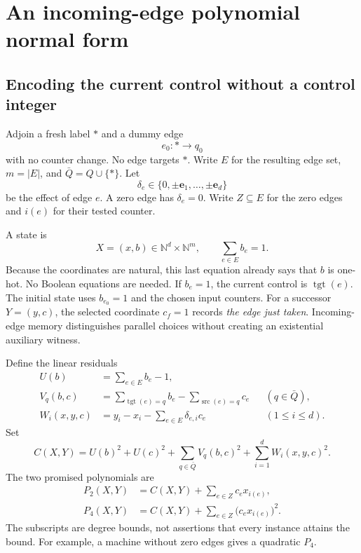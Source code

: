 \documentclass[11pt,letterpaper]{article}
\theoremstyle{definition}
\theoremstyle{remark}
\newcommand{\N}{\mathbb N}
\newcommand{\src}{\operatorname{src}}
\newcommand{\tgt}{\operatorname{tgt}}
\newcommand{\1}{\mathbf 1}
\newcommand{\srctag}[1]{\texorpdfstring{\hspace{0.4em}{\normalfont\small\color{accent}[source #1]}}{ [source #1]}}
\begin{document}
\section{An incoming-edge polynomial normal form\srctag{11}}\label{lbh:ql:sec:compiler}

\subsection{Encoding the current control without a control integer}
Adjoin a fresh label $*$ and a dummy edge
\[
 e_0:*\longrightarrow q_0
\]
with no counter change. No edge targets $*$. Write $E$ for the resulting edge
set, $m=|E|$, and $\bar Q=Q\cup\{*\}$. Let
\[
 \delta_e\in\{0,\pm\mathbf e_1,\ldots,\pm\mathbf e_d\}
\]
be the effect of edge $e$. A zero edge has $\delta_e=0$. Write $Z\subseteq E$
for the zero edges and $i(e)$ for their tested counter.

A state is
\[
 X=(x,b)\in\N^d\times\N^m,
 \qquad\sum_{e\in E}b_e=1.
\]
Because the coordinates are natural, this last equation already says that
$b$ is one-hot. No Boolean equations are needed. If $b_e=1$, the current
control is $\tgt(e)$. The initial state uses $b_{e_0}=1$ and the chosen input
counters. For a successor $Y=(y,c)$, the selected coordinate $c_f=1$ records
\emph{the edge just taken}. Incoming-edge memory distinguishes parallel
choices without creating an existential auxiliary witness.

Define the linear residuals
\begin{align}
 U(b)&=\sum_{e\in E}b_e-1,\label{lbh:ql:eq:U}\\
 V_q(b,c)&=\sum_{\tgt(e)=q}b_e-\sum_{\src(e)=q}c_e
              &&(q\in\bar Q),\label{lbh:ql:eq:V}\\
 W_i(x,y,c)&=y_i-x_i-\sum_{e\in E}\delta_{e,i}c_e
              &&(1\leq i\leq d).\label{lbh:ql:eq:W}
\end{align}
Set
\begin{equation}\label{lbh:ql:eq:common}
 C(X,Y)=U(b)^2+U(c)^2+
       \sum_{q\in\bar Q}V_q(b,c)^2+
       \sum_{i=1}^dW_i(x,y,c)^2.
\end{equation}
The two promised polynomials are
\begin{align}
 P_2(X,Y)&=C(X,Y)+\sum_{e\in Z}c_e x_{i(e)},\label{lbh:ql:eq:P2}\\
 P_4(X,Y)&=C(X,Y)+\sum_{e\in Z}\bigl(c_e x_{i(e)}\bigr)^2.
                                                        \label{lbh:ql:eq:P4}
\end{align}
The subscripts are degree bounds, not assertions that every instance attains
the bound. For example, a machine without zero edges gives a quadratic $P_4$.
\end{document}

